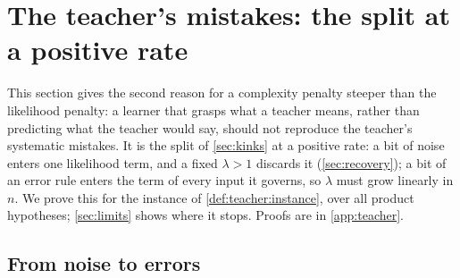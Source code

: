 \section{The teacher's mistakes: the split at a positive rate}\label{sec:teacher}

This section gives the second reason for a complexity penalty steeper than the likelihood penalty: a learner that grasps what a teacher means, rather than predicting what the teacher would say, should not reproduce the teacher's systematic mistakes. It is the split of \cref{sec:kinks} at a positive rate: a bit of noise enters one likelihood term, and a fixed $\lambda>1$ discards it (\cref{sec:recovery}); a bit of an error rule enters the term of every input it governs, so $\lambda$ must grow linearly in $n$. We prove this for the instance of \cref{def:teacher:instance}, over all product hypotheses; \cref{sec:limits} shows where it stops. Proofs are in \cref{app:teacher}.

\subsection{From noise to errors}\label{sec:teacher:hanni}\label{sec:limits:schedule}


